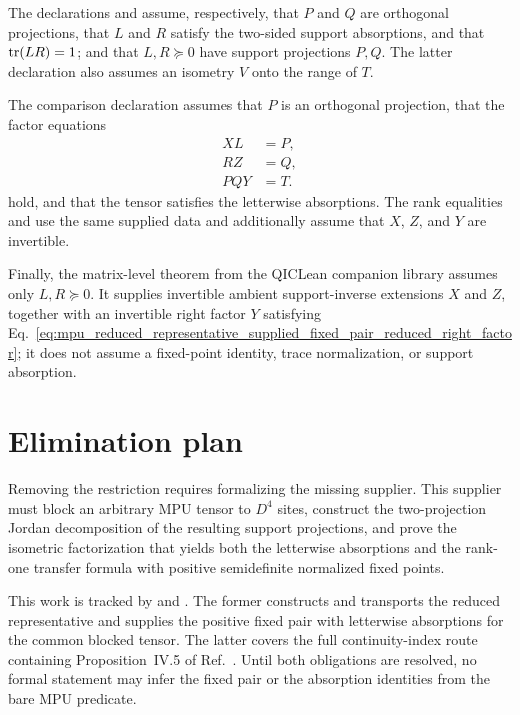 \documentclass{article}
\begin{document}
The declarations
 and
 assume,
respectively, that $P$ and $Q$ are orthogonal projections, that $L$ and $R$
satisfy the two-sided support absorptions, and that $\operatorname{tr}(LR)=1$; and that
$L,R\succeq0$ have support projections $P,Q$. The latter declaration also
assumes an isometry $V$ onto the range of $T$.

The comparison declaration
 assumes that $P$ is
an orthogonal projection, that the factor equations
\begin{align}
    XL &= P,
    \label{eq:mpu_reduced_representative_supplied_fixed_pair_left_factor}\\
    RZ &= Q,
    \label{eq:mpu_reduced_representative_supplied_fixed_pair_right_factor}\\
    PQY &= T.
    \label{eq:mpu_reduced_representative_supplied_fixed_pair_reduced_right_factor}
\end{align}
hold, and that the tensor satisfies the letterwise absorptions. The rank
equalities
 and
 use the same supplied
data and additionally assume that $X$, $Z$, and $Y$ are invertible.

Finally, the matrix-level theorem
from the QICLean companion library assumes only $L,R\succeq0$. It supplies invertible ambient support-inverse
extensions $X$ and $Z$, together with an invertible right factor $Y$ satisfying
Eq.~\ref{eq:mpu_reduced_representative_supplied_fixed_pair_reduced_right_factor};
it does not assume a fixed-point identity, trace normalization, or support
absorption.

\section{Elimination plan}

Removing the restriction requires formalizing the missing supplier. This
supplier must block an arbitrary MPU tensor to $D^4$ sites, construct the
two-projection Jordan decomposition of the resulting support projections, and
prove the isometric factorization that yields both the letterwise absorptions
and the rank-one transfer formula with positive semidefinite normalized fixed
points.

This work is tracked by  and .
The former constructs and transports the reduced representative and supplies
the positive fixed pair with letterwise absorptions for the common blocked
tensor. The latter covers the full continuity-index route containing
Proposition~IV.5 of Ref.~\cite{Cirac2017MPU}. Until both obligations are
resolved, no formal statement may infer the fixed pair or the absorption
identities from the bare MPU predicate.
\end{document}
